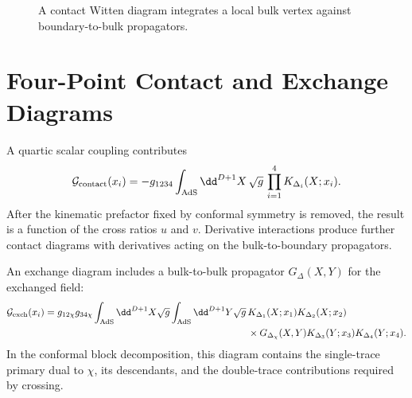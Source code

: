 \begin{figure}[H]
  \centering
  \caption{A contact Witten diagram integrates a local bulk vertex against
  boundary-to-bulk propagators.}
  \label{fig:witten-contact-three-point}
\end{figure}

\section{Four-Point Contact and Exchange Diagrams}

A quartic scalar coupling contributes
\begin{equation}
  \mathcal G_{\rm contact}(x_i)
  =
  -g_{1234}
  \int_{\mathrm{AdS}}\dd^{D+1}X\,\sqrt g\,
  \prod_{i=1}^{4}K_{\Delta_i}(X;x_i).
  \label{eq:witten-four-point-contact}
\end{equation}
After the kinematic prefactor fixed by conformal symmetry is removed, the
result is a function of the cross ratios \(u\) and \(v\).  Derivative
interactions produce further contact diagrams with derivatives acting on the
bulk-to-boundary propagators.

An exchange diagram includes a bulk-to-bulk propagator \(G_\Delta(X,Y)\) for
the exchanged field:
\begin{equation}
\begin{aligned}
  \mathcal G_{\rm exch}(x_i)
  =
  g_{12\chi}g_{34\chi}
  \int_{\mathrm{AdS}}\dd^{D+1}X\sqrt g
  \int_{\mathrm{AdS}}\dd^{D+1}Y\sqrt g\,
  &K_{\Delta_1}(X;x_1)K_{\Delta_2}(X;x_2)\\
  &\times
  G_{\Delta_\chi}(X,Y)
  K_{\Delta_3}(Y;x_3)K_{\Delta_4}(Y;x_4).
\end{aligned}
  \label{eq:witten-four-point-exchange}
\end{equation}
In the conformal block decomposition, this diagram contains the single-trace
primary dual to \(\chi\), its descendants, and the double-trace contributions
required by crossing.

